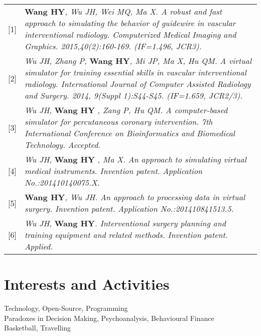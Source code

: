 \documentclass[a4paper,10pt]{article} %
\begin{document}
\begin{tabular}{p{0.3cm}p{15.0cm}}
\textsc{[1]} & \textbf{Wang HY}\emph{, Wu JH, Wei MQ, Ma X. A robust and fast approach to simulating the behavior of guidewire in vascular interventional radiology. Computerized Medical Imaging and Graphics. 2015,40(2):160-169. (IF=1.496, JCR3).}\\

\textsc{[2]} & \emph{Wu JH, Zhang P,} \textbf{Wang HY}\emph{, Mi JP, Ma X, Hu QM. A virtual simulator for training essential skills in vascular interventional radiology. International Journal of Computer Assisted Radiology and Surgery. 2014, 9(Suppl 1):S44-S45. (IF=1.659, JCR2/3).}\\

\textsc{[3]} & \emph{Wu JH,} \textbf{ Wang HY} \emph{, Zang P, Hu QM. A computer-based simulator for percutaneous coronary intervention. 7th International Conference on Bioinformatics and Biomedical Technology. Accepted.} \\

\textsc{[4]} & \emph{Wu JH,} \textbf{ Wang HY} \emph{, Ma X. An approach to simulating virtual medical instruments. Invention patent. Application No.:201410140075.X.} \\

\textsc{[5]} & \textbf{Wang HY}\emph{, Wu JH. An approach to processing data in virtual surgery. Invention patent. Application No.:201410841513.5.} \\

\textsc{[6]} & \emph{Wu JH,} \textbf{Wang HY}\emph{. Interventional surgery planning and training equipment and related methods. Invention patent. Applied. }\\

\end{tabular}










\section{Interests and Activities}

Technology, Open-Source, Programming\\
Paradoxes in Decision Making, Psychoanalysis, Behavioural Finance\\
Basketball, Travelling



\end{document}
